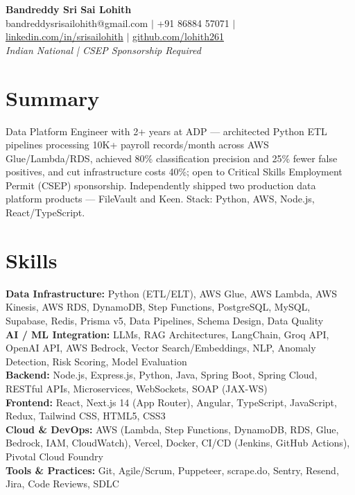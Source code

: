 \documentclass[10pt,letterpaper]{article}
\newcommand{\skillrow}[2]{\textbf{#1:} #2 \\[1pt]}
\begin{document}
\begin{center}
  {\Huge\bfseries Bandreddy Sri Sai Lohith}\\[3pt]
  \small bandreddysrisailohith@gmail.com $\vert$\; +91 86884 57071 $\vert$\; \href{https://linkedin.com/in/srisailohith}{linkedin.com/in/srisailohith} $\vert$\; \href{https://github.com/lohith261}{github.com/lohith261} \\[2pt]
  \small\textit{Indian National | CSEP Sponsorship Required}
\end{center}

\section{Summary}

Data Platform Engineer with 2+ years at ADP --- architected Python ETL pipelines processing 10K+ payroll records/month across AWS Glue/Lambda/RDS, achieved 80\% classification precision and 25\% fewer false positives, and cut infrastructure costs 40\%; open to Critical Skills Employment Permit (CSEP) sponsorship.
      Independently shipped two production data platform products --- FileVault and Keen. Stack: Python, AWS, Node.js, React/TypeScript.

\section{Skills}

\skillrow{Data Infrastructure}{Python (ETL/ELT), AWS Glue, AWS Lambda, AWS Kinesis, AWS RDS, DynamoDB, Step Functions, PostgreSQL, MySQL, Supabase, Redis, Prisma v5, Data Pipelines, Schema Design, Data Quality}
\skillrow{AI / ML Integration}{LLMs, RAG Architectures, LangChain, Groq API, OpenAI API, AWS Bedrock, Vector Search/Embeddings, NLP, Anomaly Detection, Risk Scoring, Model Evaluation}
\skillrow{Backend}{Node.js, Express.js, Python, Java, Spring Boot, Spring Cloud, RESTful APIs, Microservices, WebSockets, SOAP (JAX-WS)}
\skillrow{Frontend}{React, Next.js 14 (App Router), Angular, TypeScript, JavaScript, Redux, Tailwind CSS, HTML5, CSS3}
\skillrow{Cloud \& DevOps}{AWS (Lambda, Step Functions, DynamoDB, RDS, Glue, Bedrock, IAM, CloudWatch), Vercel, Docker, CI/CD (Jenkins, GitHub Actions), Pivotal Cloud Foundry}
\skillrow{Tools \& Practices}{Git, Agile/Scrum, Puppeteer, scrape.do, Sentry, Resend, Jira, Code Reviews, SDLC}
\end{document}
